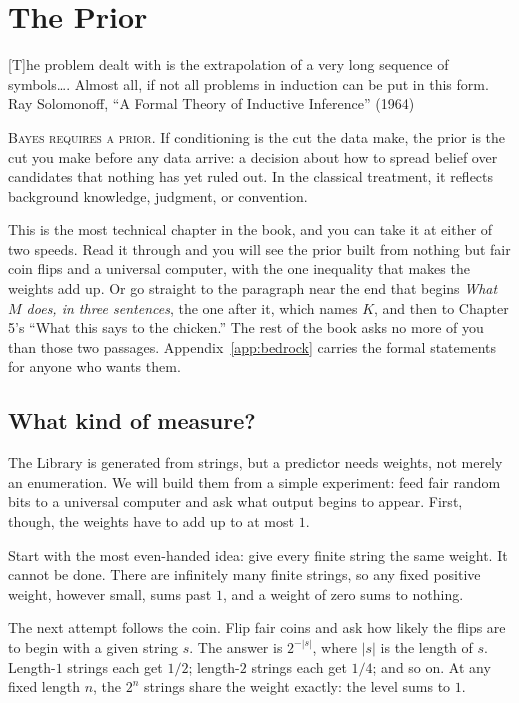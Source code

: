 \chapter{The Prior}

\chapterepigraph
{[T]he problem dealt with is the extrapolation of a very long sequence of symbols\ldots. Almost all, if not all problems in induction can be put in this form.}
{Ray Solomonoff, ``A Formal Theory of Inductive Inference'' (1964)}

\noindent \textsc{Bayes requires a prior.} If conditioning is the cut the data make, the prior is the cut you make before any data arrive: a decision about how to spread belief over candidates that nothing has yet ruled out. In the classical treatment, it reflects background knowledge, judgment, or convention.

This is the most technical chapter in the book, and you can take it at either of two speeds. Read it through and you will see the prior built from nothing but fair coin flips and a universal computer, with the one inequality that makes the weights add up. Or go straight to the paragraph near the end that begins \emph{What $M$ does, in three sentences}, the one after it, which names $K$, and then to Chapter 5's ``What this says to the chicken.'' The rest of the book asks no more of you than those two passages. Appendix~\ref{app:bedrock} carries the formal statements for anyone who wants them.

\section*{What kind of measure?}

The Library is generated from strings, but a predictor needs weights, not merely an enumeration. We will build them from a simple experiment: feed fair random bits to a universal computer and ask what output begins to appear. First, though, the weights have to add up to at most $1$.

Start with the most even-handed idea: give every finite string the same weight. It cannot be done. There are infinitely many finite strings, so any fixed positive weight, however small, sums past $1$, and a weight of zero sums to nothing.

The next attempt follows the coin. Flip fair coins and ask how likely the flips are to begin with a given string $s$. The answer is $2^{-|s|}$, where $|s|$ is the length of $s$. Length-$1$ strings each get $1/2$; length-$2$ strings each get $1/4$; and so on. At any fixed length $n$, the $2^n$ strings share the weight exactly: the level sums to $1$.

